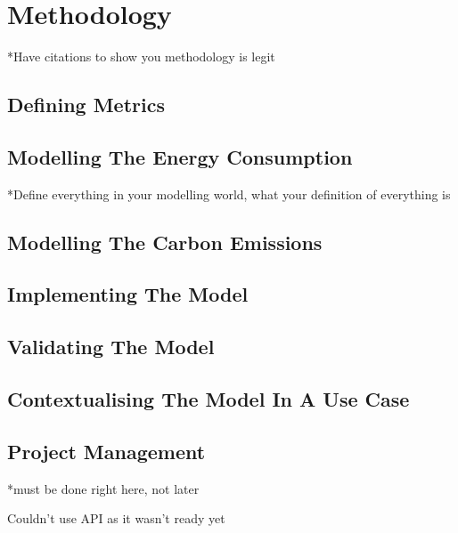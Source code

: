 \chapter {Methodology}
*Have citations to show you methodology is legit

\section {Defining Metrics}

\section {Modelling The Energy Consumption}

*Define everything in your modelling world, what your definition of everything is

\section {Modelling The Carbon Emissions }
\section {Implementing The Model}
\section {Validating The Model}
\section {Contextualising The Model In A Use Case}

\section {Project Management}
*must be done right here, not later

Couldn't use API as it wasn't ready yet